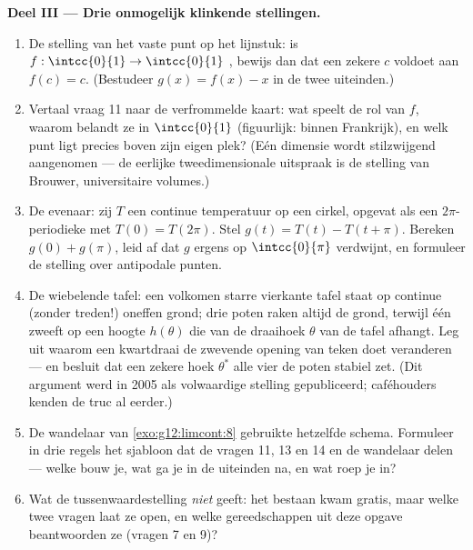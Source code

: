 \begin{problem}
\medskip
\noindent\textbf{Deel III --- Drie onmogelijk klinkende stellingen.}
\begin{enumerate}[resume]
  \item De stelling van het vaste punt op het lijnstuk: is
        $f : \intcc{0}{1} \to \intcc{0}{1}$ , bewijs dan dat een
        zekere $c$ voldoet aan $f(c) = c$. (Bestudeer $g(x) = f(x) - x$ in de
        twee uiteinden.)
  \item Vertaal vraag 11 naar de verfrommelde kaart: wat speelt de rol van
        $f$, waarom belandt ze in $\intcc{0}{1}$ (figuurlijk: binnen
        Frankrijk), en welk punt ligt precies boven zijn eigen plek? (Eén
        dimensie wordt stilzwijgend aangenomen --- de eerlijke
        tweedimensionale uitspraak is de stelling van Brouwer, universitaire
        volumes.)
  \item De evenaar: zij $T$ een continue temperatuur op een cirkel, opgevat
        als een $2\pi$-periodieke  met $T(0) = T(2\pi)$. Stel
        $g(t) = T(t) - T(t + \pi)$. Bereken $g(0) + g(\pi)$, leid af dat $g$
        ergens op $\intcc{0}{\pi}$ verdwijnt, en formuleer de stelling over
        antipodale punten.
  \item De wiebelende tafel: een volkomen starre vierkante tafel staat op
        continue (zonder treden!) oneffen grond; drie poten raken altijd de
        grond, terwijl één zweeft op een hoogte $h(\theta)$ die  van de
        draaihoek $\theta$ van de tafel afhangt. Leg uit waarom een
        kwartdraai de zwevende opening van teken doet veranderen --- en
        besluit dat een zekere hoek $\theta^*$ alle vier de poten stabiel
        zet. (Dit argument werd in 2005 als volwaardige stelling gepubliceerd;
        caféhouders kenden de truc al eerder.)
  \item De wandelaar van \cref{exo:g12:limcont:8} gebruikte hetzelfde schema.
        Formuleer in drie regels het sjabloon dat de vragen 11, 13 en 14 en de
        wandelaar delen --- welke  bouw je, wat ga je in de uiteinden
        na, en wat roep je in?
  \item Wat de tussenwaardestelling \emph{niet} geeft: het bestaan kwam
        gratis, maar welke twee vragen laat ze open, en welke gereedschappen
        uit deze opgave beantwoorden ze (vragen 7 en 9)?
\end{enumerate}


\end{problem}
